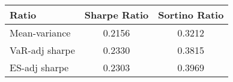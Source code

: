 \begin{tabular}{lcc}
\toprule
Ratio & Sharpe Ratio & Sortino Ratio\\
\midrule
Mean-variance & 0.2156 & 0.3212\\
VaR-adj sharpe & 0.2330 & 0.3815\\
ES-adj sharpe & 0.2303 & 0.3969\\
\bottomrule
\end{tabular}
